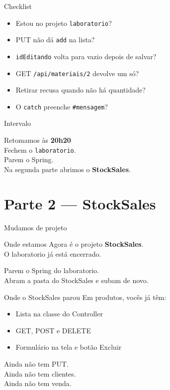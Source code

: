 \documentclass[aspectratio=169,11pt]{beamer}
\newcommand{\onde}[1]{%
  \begin{block}{Onde estamos}
    #1
  \end{block}
}
\begin{document}
\begin{frame}{Checklist}
  \begin{itemize}
    \item [ ] Estou no projeto \texttt{laboratorio}?
    \item [ ] PUT não dá \texttt{add} na lista?
    \item [ ] \texttt{idEditando} volta para vazio depois de salvar?
    \item [ ] GET \texttt{/api/materiais/2} devolve um só?
    \item [ ] Retirar recusa quando não há quantidade?
    \item [ ] O \texttt{catch} preenche \texttt{\#mensagem}?
  \end{itemize}
\end{frame}

\begin{frame}{Intervalo}
  \begin{center}
    \Large Retomamos às \textbf{20h20}\\[0.8em]
    \normalsize
    Fechem o \texttt{laboratorio}.\\
    Parem o Spring.\\
    Na segunda parte abrimos o \textbf{StockSales}.
  \end{center}
\end{frame}

\section{Parte 2 --- StockSales}

\begin{frame}{Mudamos de projeto}
  \onde{Agora é o projeto \textbf{StockSales}.\\
        O laboratorio já está encerrado.}

  Parem o Spring do laboratorio.\\
  Abram a pasta do StockSales e subam de novo.
\end{frame}

\begin{frame}{Onde o StockSales parou}
  Em produtos, vocês já têm:

  \vspace{0.4em}
  \begin{itemize}
    \item Lista na classe do Controller
    \item GET, POST e DELETE
    \item Formulário na tela e botão Excluir
  \end{itemize}

  \vspace{0.5em}
  Ainda não tem PUT.\\
  Ainda não tem clientes.\\
  Ainda não tem venda.
\end{frame}
\end{document}

